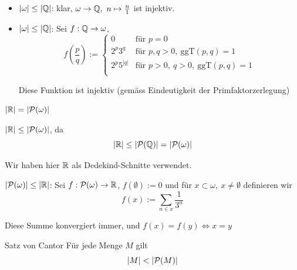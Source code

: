 \documentclass[12pt]{article}
\begin{document}
\begin{proofbox}
    \begin{itemize}
        \item $|\omega| \leq |\mathbb{Q}|$: klar, $\omega \rightarrow \mathbb{Q},\ n \mapsto \frac{n}{1}$ ist injektiv.
        \item $|\omega| \leq |\mathbb{Q}|$: Sei $f: \mathbb{Q} \rightarrow \omega$,
        $$
            f(\frac{p}{q}) := \begin{cases}
                0 & \text{für } p = 0 \\
                2^p3^q & \text{für } p, q > 0,\ \mathrm{ggT}(p, q) = 1 \\
                2^p5^{|q|} & \text{für } p > 0,\ q > 0,\ \mathrm{ggT}(p, q) = 1 \\
            \end{cases}
        $$

        Diese Funktion ist injektiv (gemäss Eindeutigkeit der Primfaktorzerlegung)
    \end{itemize}
\end{proofbox}

\begin{proposition}{}{}
    $\lvert \mathbb{R} \rvert = \lvert \mathcal{P}(\omega) \rvert $
\end{proposition}

\begin{proofbox}
    $\lvert \mathbb{R} \rvert \leq \lvert \mathcal{P}(\omega) \rvert$, da
    $$
        \lvert \mathbb{R} \rvert \leq \lvert \mathcal{P}(\mathbb{Q}) \rvert = \lvert \mathcal{P}(\omega) \rvert  
    $$

    Wir haben hier $\mathbb{R}$ als Dedekind-Schnitte verwendet.

    $\lvert \mathcal{P}(\omega) \rvert \leq \lvert \mathbb{R} \rvert$: Sei $f: \mathcal{P}(\omega) \rightarrow \mathbb{R}$, $f(\emptyset) := 0$ und für $x \subset \omega,\ x \neq \emptyset$ definieren wir
    $$
        f(x) := \sum_{n \in x} \frac{1}{3^n}
    $$

    Diese Summe konvergiert immer, und $f(x) = f(y) \iff x = y$
\end{proofbox}

\begin{theorem}{Satz von Cantor}{}
    Für jede Menge $M$ gilt
    $$
        \lvert M \rvert < \lvert \mathcal{P}(M) \rvert 
    $$
\end{theorem}
\end{document}
